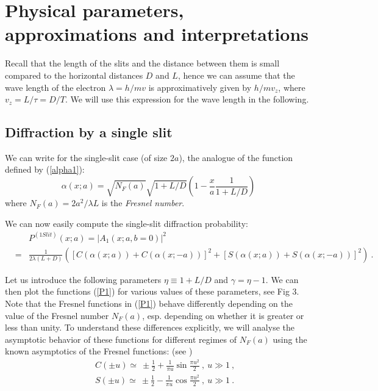 \documentclass[12pt,aps,prb,preprint]{revtex4-1}   %
\begin{document}
\section{Physical parameters, approximations and interpretations}

Recall that the length of the slits and the distance between them
is small compared to the horizontal distances $D$ and $L$, hence we can
assume that the wave length of the electron $\lambda=h/mv$ 
is approximatively given by $h/mv_z$, where $v_z=L/\tau=D/T$. 
We will use this expression for the wave length in the following.

\subsection{Diffraction by a single slit}

We can write for the single-slit case (of size $2a$), the
analogue of the function defined by (\ref{alpha1}):
\begin{equation}\label{alpha}
\alpha(x;a)=\sqrt{N_F(a)}\sqrt{1+L/D}
\left(1-\frac{x}{a}\frac{1}{1+L/D}\right)
\end{equation}
where $N_F(a)=2a^2/\lambda L$ is the \textit{Fresnel number}.

We can now easily compute the single-slit diffraction
probability:
\begin{eqnarray}\label{P1}
&&P^{(1Slit)}(x;a) = |A_1(x;a,b=0)|^2
{}\nonumber\\{}&=&\frac{1}{2\lambda(L+D)} \left([C(\alpha(x;a)) +
C(\alpha(x;-a))]^2 + [S(\alpha(x;a)) + S(\alpha(x;-a))]^2 \right)\ .
\end{eqnarray}

Let us introduce the following parameters $\eta\equiv 1+L/D$ and
$\gamma=\eta-1$. We can then plot the functions (\ref{P1}) for
various values of these parameters, see Fig 3. Note that the
Fresnel functions in (\ref{P1}) behave differently depending on
the value of the Fresnel number $N_F(a)$, esp. depending on
whether it is greater or less than unity. To understand these
differences explicitly, we will analyse the asymptotic behavior
of these functions for different regimes of $N_F(a)$ using the
known asymptotics of the Fresnel functions: (see \cite{Abramowitz})
\begin{eqnarray}\label{ApproxCS}
&& C(\pm u)\simeq\ \pm\frac{1}{2}+\frac{1}{\pi u}\sin{\frac{\pi
u^2}{2}}\ ,\ u\gg1\ , {}\nonumber\\{}&& S(\pm u)\simeq\
\pm\frac{1}{2}-\frac{1}{\pi u}\cos{\frac{\pi u^2}{2}}\ ,\ u\gg1\ .
\end{eqnarray}
\end{document}
